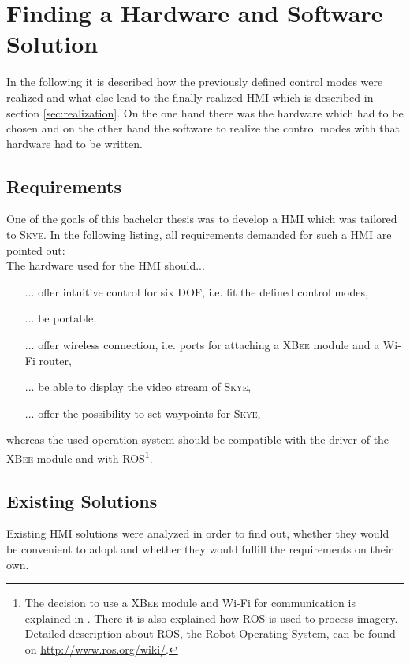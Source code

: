 \graphicspath{{graphics/HMI/}{graphics/control_modes/}}
\chapter{Finding a Hardware and Software Solution}
\label{cha:findHardSoftSolution}
In the following it is described how the previously defined control modes were realized and what else lead to the finally realized HMI which is described in section \ref{sec:realization}. On the one hand there was the hardware which had to be chosen and on the other hand the software to realize the control modes with that hardware had to be written.



\section{Requirements}
\label{sec:requirements}
One of the goals of this bachelor thesis was to develop a HMI which was tailored to \textsc{Skye}. In the following listing, all requirements demanded for such a HMI are pointed out: \\

The hardware used for the HMI should...
\begin{itemize}
\item[...]{offer intuitive control for six DOF, i.e. fit the defined control modes, }
\item[...]{be portable,}
\item[...]{offer wireless connection, i.e. ports for attaching a \textsc{XBee} module and a Wi-Fi router,}
\item[...]{be able to display the video stream of \textsc{Skye},}
\item[...]{offer the possibility to set waypoints for \textsc{Skye},}
\end{itemize}
whereas the used operation system should be compatible with the driver of the \textsc{XBee} module and with \textsc{ROS}\footnote{The decision to use a \textsc{XBee} module and Wi-Fi for communication is explained in \cite{burri}. There it is also explained how \textsc{ROS} is used to process imagery. Detailed description about \textsc{ROS}, the Robot Operating System, can be found on \url{http://www.ros.org/wiki/}.}.

\section{Existing Solutions}
\label{sec:existingSolutions}
Existing HMI solutions were analyzed in order to find out, whether they would be convenient to adopt and whether they would fulfill the requirements on their own. 

